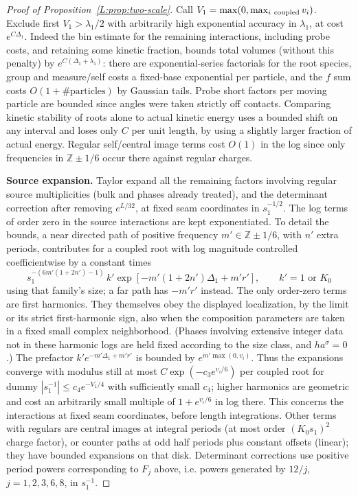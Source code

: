 \documentclass[11pt]{article}
\numberwithin{equation}{section}
\theoremstyle{definition}\newtheorem{definition}[theorem]{Definition}
\theoremstyle{remark}\newtheorem{remark}[theorem]{Remark}
\begin{document}
\begin{proof}[Proof of Proposition~\ref{L:prop:two-scale}]
Call \(V_1=\max(0,\max_{i\ {\rm coupled}}v_i)\). Exclude first \(V_1>\lambda_1/2\) with arbitrarily high exponential accuracy in \(\lambda_1\), at cost \(e^{C\Delta_1}\). Indeed the bin estimate for the remaining interactions, including probe costs, and retaining some kinetic fraction, bounds total volumes (without this penalty) by \(e^{C(\Delta_1+\lambda_1)}\): there are exponential-series factorials for the root species, group and measure/self costs a fixed-base exponential per particle, and the \(f\) sum costs \(O(1+\#\text{particles})\) by Gaussian tails. Probe short factors per moving particle are bounded since angles were taken strictly off contacts. Comparing kinetic stability of roots alone to actual kinetic energy uses a bounded shift on any interval and loses only \(C\) per unit length, by using a slightly larger fraction of actual energy. Regular self/central image terms cost \(O(1)\) in the log since only frequencies in \(\mathbb Z\pm1/6\) occur there against regular charges.

\par  \textbf{Source expansion.}
Taylor expand all the remaining factors involving regular source multiplicities (bulk and phases already treated), and the determinant correction after removing \(e^{L/32}\), at fixed seam coordinates in \(s_1^{-1/2}\). The log terms of order zero in the source interactions are kept exponentiated. To detail the bounds, a near directed path of positive frequency \(m'\in\mathbb Z\pm1/6\), with \(n'\) extra periods, contributes for a coupled root with log magnitude controlled coefficientwise by a constant times
\[
 s_1^{-(6m'(1+2n')-1)}
 \, k' \exp[-m'(1+2n')\Delta_1+m'r'],\qquad k'=1\text{ or }K_0
\]
using that family's size; a far path has \(-m'r'\) instead. The only order-zero terms are first harmonics. They themselves obey the displayed localization, by the limit or its strict first-harmonic sign, also when the composition parameters are taken in a fixed small complex neighborhood. (Phases involving extensive integer data not in these harmonic logs are held fixed according to the size class, and \(h a^\sigma=0\).) The prefactor \(k'e^{-m'\Delta_1+m'r'}\) is bounded by \(e^{m'\max(0,v_i)}\). Thus the expansions converge with modulus still at most \(C\exp(-c_3 e^{v_i/6})\) per coupled root for dummy \(|s_1^{-1}|\le c_4 e^{-V_1/4}\) with sufficiently small \(c_4\); higher harmonics are geometric and cost an arbitrarily small multiple of \(1+e^{v_i/6}\) in log there. This concerns the interactions at fixed seam coordinates, before length integrations. Other terms with regulars are central images at integral periods (at most order \((K_0s_1)^2\) charge factor), or counter paths at odd half periods plus constant offsets (linear); they have bounded expansions on that disk. Determinant corrections use positive period powers corresponding to \(F_j\) above, i.e. powers generated by \(12/j\), \(j=1,2,3,6,8\), in \(s_1^{-1}\).


\end{proof}
\end{document}
